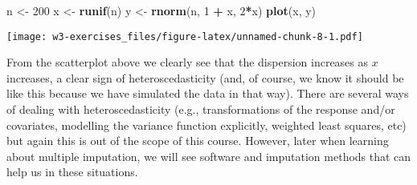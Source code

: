 \documentclass[
]{article}
\newenvironment{Shaded}{\begin{snugshade}}{\end{snugshade}}
\newcommand{\DecValTok}[1]{\textcolor[rgb]{0.00,0.00,0.81}{#1}}
\newcommand{\KeywordTok}[1]{\textcolor[rgb]{0.13,0.29,0.53}{\textbf{#1}}}
\newcommand{\NormalTok}[1]{#1}
\newcommand{\OperatorTok}[1]{\textcolor[rgb]{0.81,0.36,0.00}{\textbf{#1}}}
\newcommand{\StringTok}[1]{\textcolor[rgb]{0.31,0.60,0.02}{#1}}
\begin{document}
\begin{Shaded}
\begin{Highlighting}[]
\NormalTok{n \textless{}{-}}\StringTok{ }\DecValTok{200}
\NormalTok{x \textless{}{-}}\StringTok{ }\KeywordTok{runif}\NormalTok{(n)}
\NormalTok{y \textless{}{-}}\StringTok{ }\KeywordTok{rnorm}\NormalTok{(n, }\DecValTok{1} \OperatorTok{+}\StringTok{ }\NormalTok{x, }\DecValTok{2}\OperatorTok{*}\NormalTok{x)}
\KeywordTok{plot}\NormalTok{(x, y)}
\end{Highlighting}
\end{Shaded}

\texttt{[image: w3-exercises\_files/figure-latex/unnamed-chunk-8-1.pdf]}

From the scatterplot above we clearly see that the dispersion increases
as \(x\) increases, a clear sign of heteroscedasticity (and, of course,
we know it should be like this because we have simulated the data in
that way). There are several ways of dealing with heteroscedasticity
(e.g., transformations of the response and/or covariates, modelling the
variance function explicitly, weighted least squares, etc) but again
this is out of the scope of this course. However, later when learning
about multiple imputation, we will see software and imputation methods
that can help us in these situations.
\end{document}
